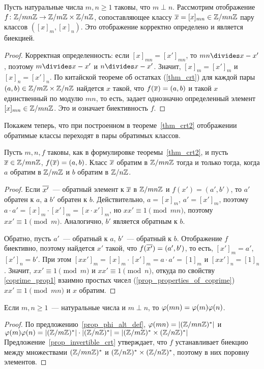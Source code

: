 \begin{theorem}\label{thm_crt2}
Пусть натуральные числа $m,n\geq 1$ таковы, что $m\perp n$.
Рассмотрим отображение $f\colon\mathbb Z/mn\mathbb Z\to\mathbb Z/m\mathbb Z\times\mathbb
Z/n\mathbb Z$, сопоставляющее классу
$\overline{x}=[x]_{mn}\in\mathbb Z/mn\mathbb Z$ пару классов $([x]_m,[x]_n)$. Это
отображение корректно определено и является биекцией.
\end{theorem}
\begin{proof}
Корректная определенность: если $[x]_{mn}=[x']_{mn}$, то $mn\divides
x-x'$, поэтому $m\divides x-x'$ и $n\divides x-x'$. Значит,
$[x]_m=[x']_m$ и $[x]_n=[x']_n$.
По китайской теореме об остатках (\ref{thm_crt}) для каждой пары
$(a,b)\in\mathbb Z/m\mathbb Z\times\mathbb Z/n\mathbb Z$ найдется $x$ такой, что
$f(\overline{x})=(a,b)$ и такой $x$ единственный по модулю $mn$, то есть,
задает однозначно определенный элемент $[x]_{mn}\in\mathbb Z/mn\mathbb Z$. Это
и означает биективность $f$.
\end{proof}

Покажем теперь, что при построенном в теореме~\ref{thm_crt2}
отображении обратимые классы переходят в пары обратимых классов.

\begin{proposition}\label{prop_invertible_crt}
Пусть $m,n,f$ таковы, как в формулировке теоремы~\ref{thm_crt2}, и
пусть
$\overline{x}\in\mathbb Z/mn\mathbb Z$, $f(\overline{x})=(a,b)$. Класс $\overline{x}$ обратим в
$\mathbb Z/mn\mathbb Z$ тогда и только тогда, когда $a$ обратим в $\mathbb Z/m\mathbb
Z$ и $b$ обратим в $\mathbb Z/n\mathbb Z$.
\end{proposition}
\begin{proof}
Если $\overline{x'}$~--- обратный элемент к $\overline{x}$ в $\mathbb Z/mn\mathbb Z$ и
$f(x')=(a',b')$, то $a'$ обратен к $a$, а $b'$ обратен к
$b$. Действительно, $a=[x]_m$, $a'=[x']_m$, поэтому $a\cdot
a'=[x]_m\cdot [x']_m=[x\cdot x']_m$, но $xx'\equiv 1\pmod{mn}$,
поэтому $xx'\equiv 1\pmod m$. Аналогично, $b'$ является обратным к
$b$. 

Обратно, пусть $a'$~--- обратный к $a$, $b'$~--- обратный к
$b$. Отображение $f$ биективно, поэтому найдется $x'$ такой, что
$f(\overline{x'})=(a',b')$, то есть, $[x']_m=a'$, $[x']_n=b'$. При этом
$[xx']_m=[x]_m\cdot [x']_m=a\cdot a'=[1]_m$ и $[xx']_n=[1]_n$. Значит,
$xx'\equiv 1\pmod m$ и $xx'\equiv 1\pmod n$, откуда по свойству
\ref{coprime_prop1} взаимно простых чисел
(\ref{prop_properties_of_coprime})
$xx'\equiv 1\pmod{mn}$ и $x$ обратим.
\end{proof}

\begin{theorem}\label{thm_euler_multiplicative}
Если $m,n\geq 1$~--- натуральные числа и $m\perp n$, то $\varphi(mn)=\varphi(m)\varphi(n)$.
\end{theorem}
\begin{proof}
По предложению~\ref{prop_phi_alt_def}, $\varphi(mn)=|(\mathbb Z/mn\mathbb Z)^*|$ и
$\varphi(m)\varphi(n)=|(\mathbb Z/m\mathbb Z)^*|\cdot|(\mathbb Z/n\mathbb Z)^*|=|(\mathbb Z/m\mathbb
Z)^*\times (\mathbb Z/n\mathbb Z)^*|$
Предложение~\ref{prop_invertible_crt} утверждает, что $f$
устанавливает биекцию между множествами $(\mathbb Z/mn\mathbb Z)^*$ и $(\mathbb
Z/n\mathbb Z)^*\times (\mathbb Z/n\mathbb Z)^*$, поэтому в них поровну элементов.
\end{proof}

